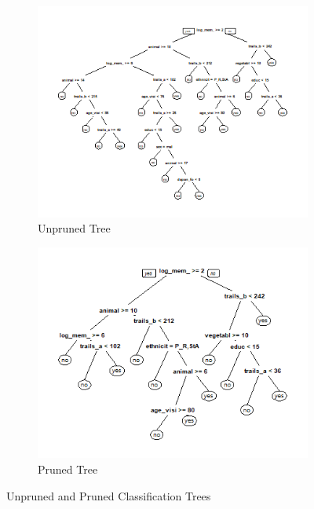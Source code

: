\documentclass[a4paper,man,natbib,11pt]{article}
\begin{document}
\begin{figure}[h!]
\centering
\begin{subfigure}{.5\textwidth}
  \centering
  \includegraphics[width=\linewidth]{unpruned_tree.png}
  \caption{Unpruned Tree}
  \label{fig:sub1}
\end{subfigure}%
\begin{subfigure}{.5\textwidth}
  \centering
  \includegraphics[width=\linewidth]{pruned_tree.png}
  \caption{Pruned Tree}
  \label{fig:sub2}
\end{subfigure}
\caption{Unpruned and Pruned Classification Trees}
\label{fig:test}
\end{figure}
\end{document}
